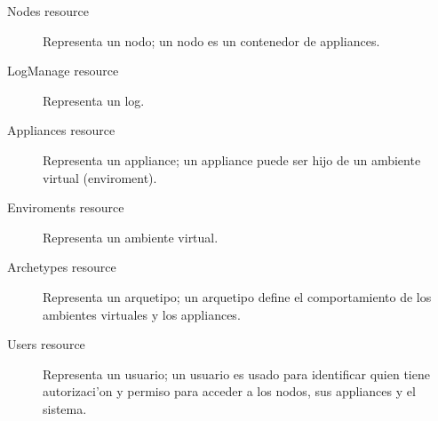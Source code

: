 \begin{description}
\item [Nodes resource] Representa un nodo; un nodo es un contenedor de appliances.	
\item [LogManage resource] Representa un log. 
\item [Appliances resource] Representa un appliance; un appliance puede ser hijo de un ambiente virtual (enviroment).
\item[Enviroments resource] Representa un ambiente virtual.
\item [Archetypes resource] Representa un arquetipo; un arquetipo define el comportamiento de los ambientes virtuales y los appliances.
\item [Users resource]  Representa un usuario; un usuario es usado para identificar quien tiene autorizaci'on y permiso para acceder a los nodos, sus appliances y el sistema.
\end{description}

